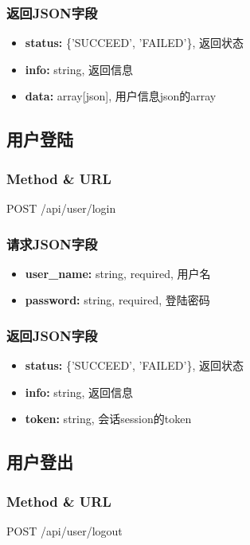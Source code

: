 ﻿\documentclass[a4paper]{report}
\begin{document}
\subsubsection{返回JSON字段}
\begin{itemize}
	\item \textbf{status:} \{'SUCCEED', 'FAILED'\}, 返回状态
	\item \textbf{info:} string, 返回信息
	\item \textbf{data:} array[json], 用户信息json的array
\end{itemize}





\subsection{用户登陆} %
\subsubsection{Method \& URL} %
POST /api/user/login 

\subsubsection{请求JSON字段}
\begin{itemize}
	\item \textbf{user\_name:} string, required, 用户名
	\item \textbf{password:} string, required, 登陆密码	
\end{itemize}

\subsubsection{返回JSON字段}
\begin{itemize}
	\item \textbf{status:} \{'SUCCEED', 'FAILED'\}, 返回状态
	\item \textbf{info:} string, 返回信息
	\item \textbf{token:} string, 会话session的token
\end{itemize}





\subsection{用户登出} %
\subsubsection{Method \& URL} %
POST /api/user/logout 
\end{document}
